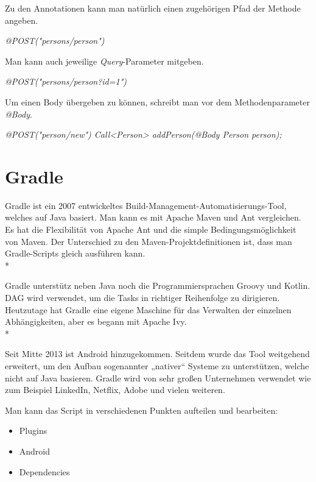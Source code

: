 Zu den Annotationen kann man natürlich einen zugehörigen Pfad der Methode angeben.

\textit{@POST("persons/person")}

Man kann auch jeweilige \textit{Query}-Parameter mitgeben.

\textit{@POST("persons/person?id=1")}

Um einen Body übergeben zu können, schreibt man vor dem Methodenparameter \textit{@Body}.

\textit{
@POST("person/new")
Call<Person> addPerson(@Body Person person);
}



\section{Gradle}
\cite{Gradle1}
\cite{Gradle2}
\author{Bozidar Spasenovic}
Gradle ist ein 2007 entwickeltes Build-Management-Automatisierungs-Tool, welches auf Java basiert.
Man kann es mit Apache Maven und Ant vergleichen.
Es hat die Flexibilität von Apache Ant und die simple Bedingungsmöglichkeit von Maven.
Der Unterschied zu den  Maven-Projektdefinitionen ist, dass man Gradle-Scripts gleich ausführen kann.
 \\*
    
Gradle unterstütz neben Java noch die Programmiersprachen Groovy und Kotlin.
DAG wird verwendet, um die Tasks in richtiger Reihenfolge zu dirigieren.
Heutzutage hat Gradle eine eigene Maschine für das Verwalten der einzelnen Abhängigkeiten, aber es begann mit Apache Ivy.
\\*


Seit Mitte 2013 ist Android hinzugekommen. Seitdem wurde das Tool weitgehend erweitert, um den Aufbau sogenannter „nativer“ Systeme zu unterstützen, welche nicht auf Java basieren.
Gradle wird von sehr großen Unternehmen verwendet wie zum Beispiel LinkedIn, Netflix, Adobe und vielen weiteren.

Man kann das Script in verschiedenen Punkten aufteilen und bearbeiten:
\begin{itemize}
    \item Plugins
    \item Android
    \item Dependencies
\end{itemize}





\pagebreak




